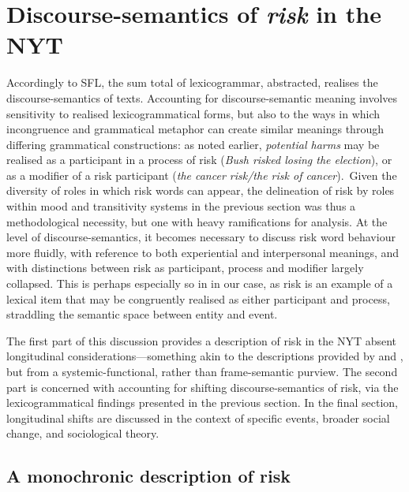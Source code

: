 
\chapter{Discourse-semantics of \emph{risk} in the NYT} \label{chap:discussion}

Accordingly to SFL, the sum total of lexicogrammar, abstracted, realises the discourse-semantics of texts. Accounting for discourse-semantic meaning involves sensitivity to realised lexicogrammatical forms, but also to the ways in which incongruence and grammatical metaphor can create similar meanings through differing grammatical constructions: as noted earlier, \emph{potential harms} may be realised as a participant in a process of risk (\emph{Bush risked losing the election}), or as a modifier of a risk participant (\emph{the cancer risk\slash the risk of cancer}).~Given the diversity of roles in which risk words can appear, the delineation of risk by roles within mood and transitivity systems in the previous section was thus a methodological necessity, but one with heavy ramifications for analysis. At the level of discourse-semantics, it becomes necessary to discuss risk word behaviour more fluidly, with reference to both experiential and interpersonal meanings, and with distinctions between risk as participant, process and modifier largely collapsed. This is perhaps especially so in in our case, as risk is an example of a lexical item that may be congruently realised as either participant and process, straddling the semantic space between entity and event.

The first part of this discussion provides a description of risk in the NYT absent longitudinal considerations---something akin to the descriptions provided by  and , but from a systemic-functional, rather than frame-semantic purview. The second part is concerned with accounting for shifting discourse-semantics of risk, via the lexicogrammatical findings presented in the previous section. In the final section, longitudinal shifts are discussed in the context of specific events, broader social change, and sociological theory.

\section{A monochronic description of risk}

